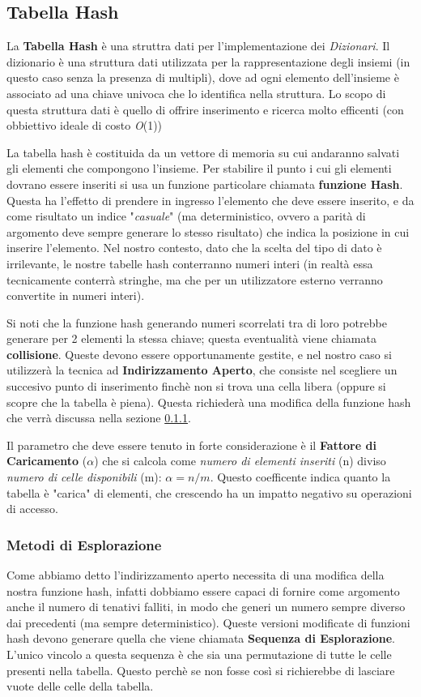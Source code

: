 \documentclass{article}
\newcommand{\bigO}{\emph{O}}
\begin{document}
\subsection{Tabella Hash}
La \textbf{Tabella Hash} è una struttra dati per l'implementazione dei \emph{Dizionari}. Il dizionario è una struttura dati utilizzata per la rappresentazione degli insiemi (in questo caso senza la presenza di multipli), dove ad ogni elemento dell'insieme è associato ad una chiave univoca che lo identifica nella struttura. Lo scopo di questa struttura dati è quello di offrire inserimento e ricerca molto efficenti (con obbiettivo ideale di costo \bigO(1)) 

La tabella hash è costituida da un vettore di memoria su cui andaranno salvati gli elementi che compongono l'insieme. Per stabilire il punto i cui gli elementi dovrano essere inseriti si usa un funzione particolare chiamata \textbf{funzione Hash}. Questa ha l'effetto di prendere in ingresso l'elemento che deve essere inserito, e da come risultato un indice "\emph{casuale}" (ma deterministico, ovvero a parità di argomento deve sempre generare lo stesso risultato) che indica la posizione in cui inserire l'elemento. Nel nostro contesto, dato che la scelta del tipo di dato è irrilevante, le nostre tabelle hash conterranno numeri interi (in realtà essa tecnicamente conterrà stringhe, ma che per un utilizzatore esterno verranno convertite in numeri interi).

Si noti che la funzione hash generando numeri scorrelati tra di loro potrebbe generare per 2 elementi la stessa chiave; questa eventualità viene chiamata \textbf{collisione}. Queste devono essere opportunamente gestite, e nel nostro caso si utilizzerà la tecnica ad \textbf{Indirizzamento Aperto}, che consiste nel scegliere un succesivo punto di inserimento finchè non si trova una cella libera (oppure si scopre che la tabella è piena). Questa richiederà una modifica della funzione hash che verrà discussa nella sezione \ref{eplorazione}.

\label{fattore_caricamento}
Il parametro che deve essere tenuto in forte considerazione è il \textbf{Fattore di Caricamento} ($\alpha$) che si calcola come \emph{numero di elementi inseriti} (n) diviso \emph{numero di celle disponibili} (m): $\alpha = n / m$.
Questo coefficente indica quanto la tabella è "carica" di elementi, che crescendo ha un impatto negativo su operazioni di accesso.

\subsubsection{Metodi di Esplorazione}
\label{eplorazione}
Come abbiamo detto l'indirizzamento aperto necessita di una modifica della nostra funzione hash, infatti dobbiamo essere capaci di fornire come argomento anche il numero di tenativi falliti, in modo che generi un numero sempre diverso dai precedenti (ma sempre deterministico). Queste versioni modificate di funzioni hash devono generare quella che viene chiamata \textbf{Sequenza di Esplorazione}. L'unico vincolo a questa sequenza è che sia una permutazione di tutte le celle presenti nella tabella. Questo perchè se non fosse così si richierebbe di lasciare vuote delle celle della tabella.
\end{document}
